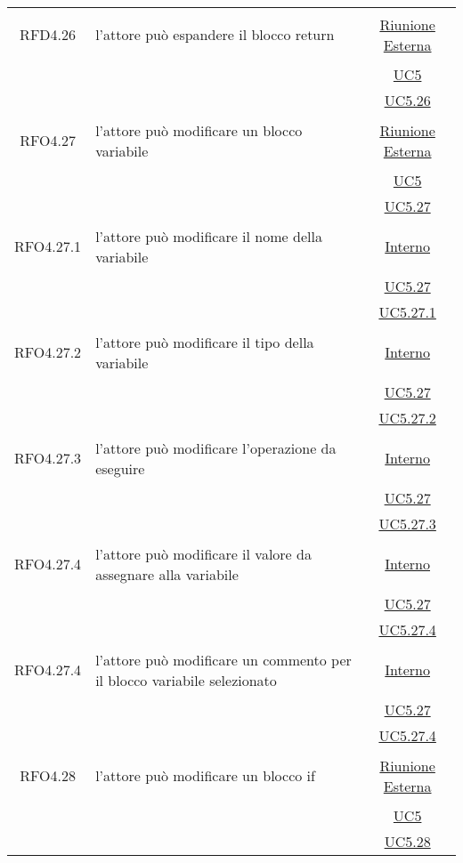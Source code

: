 \begin{longtable}{|c|>{\centering}m{7cm}|c|}
\hypertarget{RFD4.26}{RFD4.26} & l'attore può espandere il blocco return &  \hyperlink{Riunione Esterna}{Riunione Esterna}\\
& &\hyperref[UC5]{UC5}\\
& &\hyperref[UC5.26]{UC5.26}\\ \hline

\hypertarget{RFO4.27}{RFO4.27} & l'attore può modificare un blocco variabile &  \hyperlink{Riunione Esterna}{Riunione Esterna}\\
& &\hyperref[UC5]{UC5}\\
& &\hyperref[UC5.27]{UC5.27}\\ \hline

\hypertarget{RFO4.27.1}{RFO4.27.1} & l'attore può modificare il nome della variabile & \hyperlink{Interno}{Interno}\\
& &\hyperref[UC5.27]{UC5.27}\\
& &\hyperref[UC5.27.1]{UC5.27.1}\\ \hline

\hypertarget{RFO4.27.2}{RFO4.27.2} & l'attore può modificare il tipo della variabile & \hyperlink{Interno}{Interno}\\
& &\hyperref[UC5.27]{UC5.27}\\
& &\hyperref[UC5.27.2]{UC5.27.2}\\ \hline

\hypertarget{RFO4.27.3}{RFO4.27.3} & l'attore può modificare l'operazione da eseguire & \hyperlink{Interno}{Interno}\\
& &\hyperref[UC5.27]{UC5.27}\\
& &\hyperref[UC5.27.3]{UC5.27.3}\\ \hline


\hypertarget{RFO4.27.4}{RFO4.27.4} & l'attore può modificare il valore da assegnare alla variabile &\hyperlink{Interno}{Interno}\\
& &\hyperref[UC5.27]{UC5.27}\\
& &\hyperref[UC5.27.4]{UC5.27.4}\\ \hline

\hypertarget{RFO4.27.4}{RFO4.27.4} & l'attore può modificare un commento per il blocco variabile selezionato&\hyperlink{Interno}{Interno}\\
& &\hyperref[UC5.27]{UC5.27}\\
& &\hyperref[UC5.27.4]{UC5.27.4}\\ \hline

\hypertarget{RFO4.28}{RFO4.28} & l'attore può modificare un blocco if & \hyperlink{Riunione Esterna}{Riunione Esterna}\\
& &\hyperref[UC5]{UC5}\\
& &\hyperref[UC5.28]{UC5.28}\\ \hline


\end{longtable}
